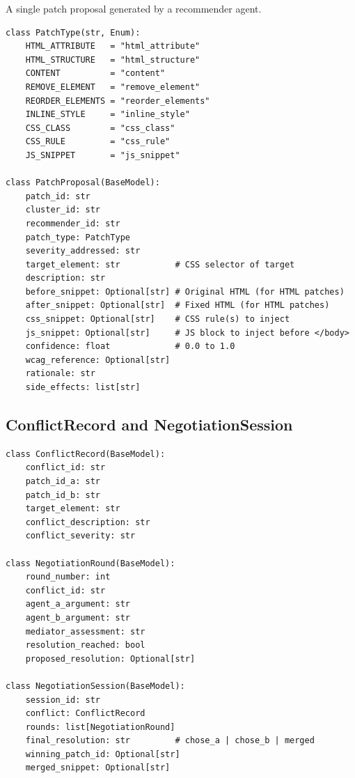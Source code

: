 A single patch proposal generated by a recommender agent.

\begin{lstlisting}[caption={PatchProposal Pydantic model (from \filepath{schemas/patch\_schema.py}).}, label={lst:patchproposal}]
class PatchType(str, Enum):
    HTML_ATTRIBUTE   = "html_attribute"
    HTML_STRUCTURE   = "html_structure"
    CONTENT          = "content"
    REMOVE_ELEMENT   = "remove_element"
    REORDER_ELEMENTS = "reorder_elements"
    INLINE_STYLE     = "inline_style"
    CSS_CLASS        = "css_class"
    CSS_RULE         = "css_rule"
    JS_SNIPPET       = "js_snippet"

class PatchProposal(BaseModel):
    patch_id: str
    cluster_id: str
    recommender_id: str
    patch_type: PatchType
    severity_addressed: str
    target_element: str           # CSS selector of target
    description: str
    before_snippet: Optional[str] # Original HTML (for HTML patches)
    after_snippet: Optional[str]  # Fixed HTML (for HTML patches)
    css_snippet: Optional[str]    # CSS rule(s) to inject
    js_snippet: Optional[str]     # JS block to inject before </body>
    confidence: float             # 0.0 to 1.0
    wcag_reference: Optional[str]
    rationale: str
    side_effects: list[str]
\end{lstlisting}

\subsection{ConflictRecord and NegotiationSession}

\begin{lstlisting}[caption={Conflict and negotiation schemas (from \filepath{schemas/patch\_schema.py}).}, label={lst:conflict}]
class ConflictRecord(BaseModel):
    conflict_id: str
    patch_id_a: str
    patch_id_b: str
    target_element: str
    conflict_description: str
    conflict_severity: str

class NegotiationRound(BaseModel):
    round_number: int
    conflict_id: str
    agent_a_argument: str
    agent_b_argument: str
    mediator_assessment: str
    resolution_reached: bool
    proposed_resolution: Optional[str]

class NegotiationSession(BaseModel):
    session_id: str
    conflict: ConflictRecord
    rounds: list[NegotiationRound]
    final_resolution: str         # chose_a | chose_b | merged
    winning_patch_id: Optional[str]
    merged_snippet: Optional[str]
\end{lstlisting}

